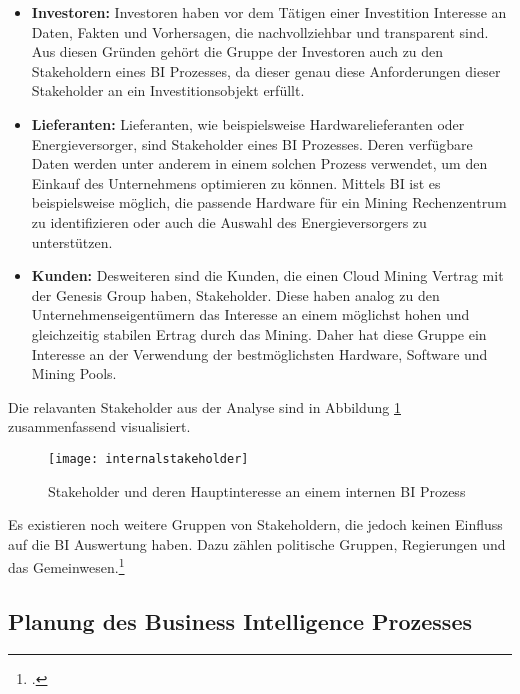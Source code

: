\begin{itemize}
\begin{itemize}
        Daher benötigen diese vor allem technische \acp{KPI}, die durch \ac{HT0.2} abgedeckt werden. Durch die Verfügbarkeit
        dieser Daten kann die Effizienz der Hardware besser abgeschätzt und mögliche Verbesserungen identifiziert werden.
    \end{itemize}
    \item \textbf{Investoren: }Investoren haben vor dem Tätigen einer Investition Interesse an Daten, Fakten und Vorhersagen, die
    nachvollziehbar und transparent sind. Aus diesen Gründen gehört die Gruppe der Investoren auch zu den Stakeholdern eines \ac{BI} Prozesses,
    da dieser genau diese Anforderungen dieser Stakeholder an ein Investitionsobjekt erfüllt.
    \item \textbf{Lieferanten: }Lieferanten, wie beispielsweise Hardwarelieferanten oder Energieversorger, sind Stakeholder eines
    \ac{BI} Prozesses. Deren verfügbare Daten werden unter anderem in einem solchen Prozess verwendet, um den Einkauf des Unternehmens
    optimieren zu können. Mittels \ac{BI} ist es beispielsweise möglich, die passende Hardware für ein Mining Rechenzentrum zu identifizieren
    oder auch die Auswahl des Energieversorgers zu unterstützen.
    \item \textbf{Kunden: }Desweiteren sind die Kunden, die einen Cloud Mining Vertrag mit der Genesis Group haben, Stakeholder. Diese
    haben analog zu den Unternehmenseigentümern das Interesse an einem möglichst hohen und gleichzeitig stabilen Ertrag durch das Mining. 
    Daher hat diese Gruppe ein Interesse an der Verwendung der bestmöglichsten Hardware, Software und Mining Pools.
\end{itemize}

Die relavanten Stakeholder aus der Analyse sind in Abbildung \ref{figure:internalstakeholder} zusammenfassend visualisiert.

\begin{figure}[H]
    \caption{Stakeholder und deren Hauptinteresse an einem internen \ac{BI} Prozess}
    \texttt{[image: internalstakeholder]}
    \label{figure:internalstakeholder}
\end{figure}

Es existieren noch weitere Gruppen von Stakeholdern, die jedoch keinen Einfluss auf die \ac{BI} Auswertung haben.
Dazu zählen politische Gruppen, Regierungen und das Gemeinwesen.\footcite[Vgl.][Abb. 14.2]{simmers2004stakeholder}

\subsection{Planung des Business Intelligence Prozesses} \label{toc:planungdesbiprozesses}


